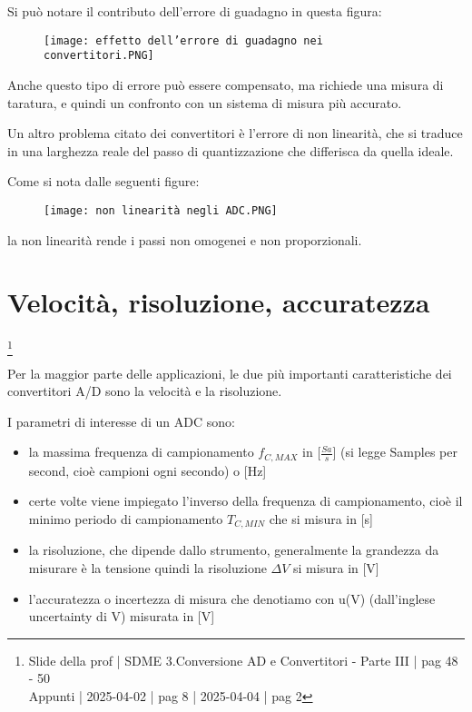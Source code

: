 Si può notare il contributo dell'errore di guadagno in questa figura: 

\begin{figure}[h]
    \centering
    \texttt{[image: effetto dell'errore di guadagno nei convertitori.PNG]}
\end{figure}

Anche questo tipo di errore può essere compensato, ma richiede una misura di taratura, e quindi un confronto con un sistema di misura più accurato. \newline 

Un altro problema citato dei convertitori è l'errore di non linearità, che si traduce in una larghezza reale del passo di quantizzazione che differisca da quella ideale. \newline 

Come si nota dalle seguenti figure: 

\begin{figure}[h]
    \centering
    \texttt{[image: non linearità negli ADC.PNG]}
\end{figure}

la non linearità rende i passi non omogenei e non proporzionali. \newline 

\newpage 

\section{Velocità, risoluzione, accuratezza}
\footnote{Slide della prof | SDME 3.Conversione AD e Convertitori - Parte III | pag 48 - 50 \\  
Appunti | 2025-04-02 | pag 8 | 2025-04-04 | pag 2 }

Per la maggior parte delle applicazioni, le due più importanti caratteristiche dei convertitori A/D sono la velocità e la risoluzione. \newline 

I parametri di interesse di un ADC sono: 

\begin{itemize}
    \item la massima frequenza di campionamento $f_{C, MAX}$ in [$\frac{Sa}{s}$] (si legge Samples per second, cioè campioni ogni secondo) o [Hz]
    \item certe volte viene impiegato l'inverso della frequenza di campionamento, cioè il minimo periodo di campionamento $T_{C, MIN}$ che si misura in [s]
    \item la risoluzione, che dipende dallo strumento, generalmente la grandezza da misurare è la tensione quindi la risoluzione $\Delta V$ si misura in [V] 
    \item l'accuratezza o incertezza di misura che denotiamo con u(V) (dall'inglese uncertainty di V) misurata in [V]
\end{itemize}


